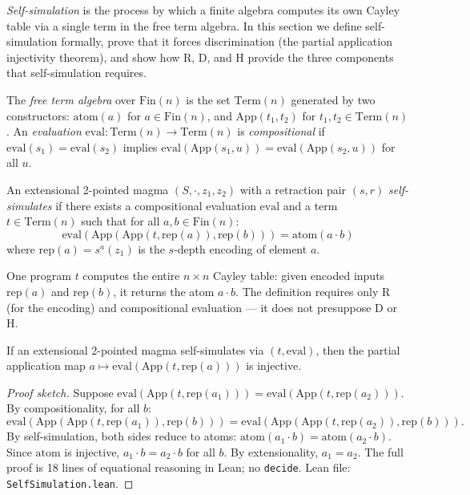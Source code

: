\documentclass[a4paper,UKenglish,cleveref,autoref,thm-restate]{lipics-v2021}
\newcommand{\dotop}{\cdot}
\newcommand{\Fin}{\mathrm{Fin}}
\begin{document}
\emph{Self-simulation} is the process by which a finite algebra computes its own Cayley table via a single term in the free term algebra. In this section we define self-simulation formally, prove that it forces discrimination (the partial application injectivity theorem), and show how R, D, and H provide the three components that self-simulation requires.

\begin{definition}
The \emph{free term algebra} over $\Fin(n)$ is the set $\text{Term}(n)$ generated by two constructors: $\text{atom}(a)$ for $a \in \Fin(n)$, and $\text{App}(t_1, t_2)$ for $t_1, t_2 \in \text{Term}(n)$. An \emph{evaluation} $\text{eval} : \text{Term}(n) \to \text{Term}(n)$ is \emph{compositional} if $\text{eval}(s_1) = \text{eval}(s_2)$ implies $\text{eval}(\text{App}(s_1, u)) = \text{eval}(\text{App}(s_2, u))$ for all $u$.
\end{definition}

\begin{definition}
\label{def:selfsim}
An extensional 2-pointed magma $(S, \dotop, z_1, z_2)$ with a retraction pair $(s, r)$ \emph{self-simulates} if there exists a compositional evaluation $\text{eval}$ and a term $t \in \text{Term}(n)$ such that for all $a, b \in \Fin(n)$:
\[
\text{eval}(\text{App}(\text{App}(t, \text{rep}(a)), \text{rep}(b))) = \text{atom}(a \dotop b)
\]
where $\text{rep}(a) = s^{a}(z_1)$ is the $s$-depth encoding of element $a$.
\end{definition}

One program $t$ computes the entire $n \times n$ Cayley table: given encoded inputs $\text{rep}(a)$ and $\text{rep}(b)$, it returns the atom $a \dotop b$. The definition requires only R (for the encoding) and compositional evaluation --- it does not presuppose D or H.

\begin{theorem}
\label{thm:injectivity}
If an extensional 2-pointed magma self-simulates via $(t, \text{eval})$, then the partial application map $a \mapsto \text{eval}(\text{App}(t, \text{rep}(a)))$ is injective.
\end{theorem}

\begin{proof}[Proof sketch]
Suppose $\text{eval}(\text{App}(t, \text{rep}(a_1))) = \text{eval}(\text{App}(t, \text{rep}(a_2)))$. By compositionality, for all $b$:
\[
\text{eval}(\text{App}(\text{App}(t, \text{rep}(a_1)), \text{rep}(b))) = \text{eval}(\text{App}(\text{App}(t, \text{rep}(a_2)), \text{rep}(b))).
\]
By self-simulation, both sides reduce to atoms: $\text{atom}(a_1 \dotop b) = \text{atom}(a_2 \dotop b)$. Since $\text{atom}$ is injective, $a_1 \dotop b = a_2 \dotop b$ for all $b$. By extensionality, $a_1 = a_2$. The full proof is 18 lines of equational reasoning in Lean; no \texttt{decide}. Lean file: \texttt{SelfSimulation.lean}.
\end{proof}
\end{document}
